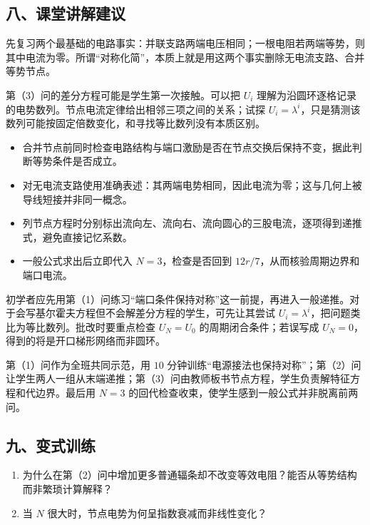 \documentclass[12pt,a4paper,UTF8]{ctexart}
\newcommand{\tightlist}{\setlength{\itemsep}{0pt}\setlength{\parskip}{0pt}}
\begin{document}
\subsection{八、课堂讲解建议}\label{ux516bux8bfeux5802ux8bb2ux89e3ux5efaux8bae-2}

先复习两个最基础的电路事实：并联支路两端电压相同；一根电阻若两端等势，则其中电流为零。所谓``对称化简''，本质上就是用这两个事实删除无电流支路、合并等势节点。

第（3）问的差分方程可能是学生第一次接触。可以把 \(U_i\)
理解为沿圆环逐格记录的电势数列。节点电流定律给出相邻三项之间的关系；试探
\(U_i=\lambda^i\)，只是猜测该数列可能按固定倍数变化，和寻找等比数列没有本质区别。

\begin{itemize}
\tightlist
\item
  合并节点前同时检查电路结构与端口激励是否在节点交换后保持不变，据此判断等势条件是否成立。
\item
  对无电流支路使用准确表述：其两端电势相同，因此电流为零；这与几何上被导线短接并非同一概念。
\item
  列节点方程时分别标出流向左、流向右、流向圆心的三股电流，逐项得到递推式，避免直接记忆系数。
\item
  一般公式求出后立即代入 \(N=3\)，检查是否回到
  \(12r/7\)，从而核验周期边界和端口电流。
\end{itemize}

初学者应先用第（1）问练习``端口条件保持对称''这一前提，再进入一般递推。对于会写基尔霍夫方程但不会解差分方程的学生，可先让其尝试
\(U_i=\lambda^i\)，把问题类比为等比数列。批改时要重点检查 \(U_N=U_0\)
的周期闭合条件；若误写成 \(U_N=0\)，得到的将是开口梯形网络而非圆环。

第（1）问作为全班共同示范，用 \(10\)
分钟训练``电源接法也保持对称''；第（2）问让学生两人一组从末端递推；第（3）问由教师板书节点方程，学生负责解特征方程和代边界。最后用
\(N=3\) 的回代检查收束，使学生感到一般公式并非脱离前两问。

\subsection{九、变式训练}\label{ux4e5dux53d8ux5f0fux8badux7ec3-2}

\begin{enumerate}
\def\labelenumi{\arabic{enumi}.}
\tightlist
\item
  为什么在第（2）问中增加更多普通辐条却不改变等效电阻？能否从等势结构而非繁琐计算解释？
\item
  当 \(N\) 很大时，节点电势为何呈指数衰减而非线性变化？
\end{enumerate}
\end{document}
